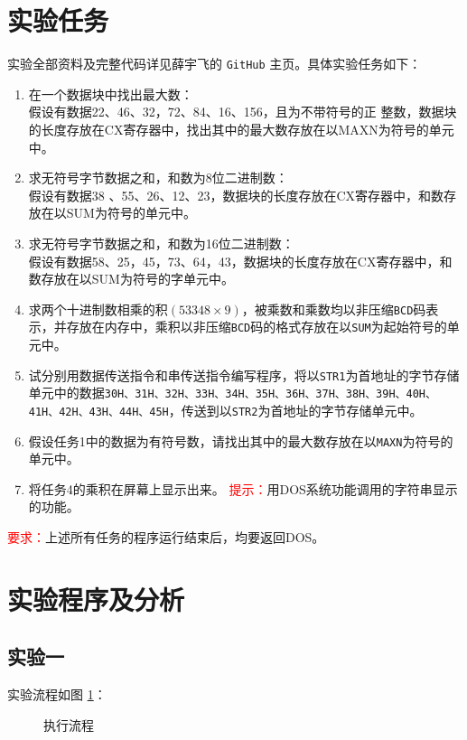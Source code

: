 \documentclass[11pt]{SEU-Digital-Report}
\begin{document}
\section{实验任务}
实验全部资料及完整代码详见薛宇飞的 \texttt{GitHub} 主页\cite{mygit}。具体实验任务如下：
\begin{enumerate}
    \item 在一个数据块中找出最大数：\\
    假设有数据22、46、32，72、84、16、156，且为不带符号的正 整数，数据块的长度存放在CX寄存器中，找出其中的最大数存放在以MAXN为符号的单元中。
    \item 求无符号字节数据之和，和数为8位二进制数：\\
    假设有数据38 、55、26、12、23，数据块的长度存放在CX寄存器中，和数存放在以SUM为符号的单元中。
    \item 求无符号字节数据之和，和数为16位二进制数：\\
    假设有数据58、25，45，73、64，43，数据块的长度存放在CX寄存器中，和数存放在以SUM为符号的字单元中。
    \item 求两个十进制数相乘的积$(53348\times 9)$，被乘数和乘数均以非压缩\texttt{BCD}码表示，并存放在内存中，乘积以非压缩\texttt{BCD}码的格式存放在以\texttt{SUM}为起始符号的单元中。
    \item 试分别用数据传送指令和串传送指令编写程序，将以\texttt{STR1}为首地址的字节存储单元中的数据\texttt{30H、31H、32H、33H、34H、35H、36H、37H、38H、39H、40H、41H、42H、43H、44H、45H}，传送到以\texttt{STR2}为首地址的字节存储单元中。
    \item 假设任务1中的数据为有符号数，请找出其中的最大数存放在以\texttt{MAXN}为符号的单元中。
    \item 将任务4的乘积在屏幕上显示出来。
    \textcolor{red}{提示：}用DOS系统功能调用的字符串显示的功能。
\end{enumerate}
\textcolor{red}{要求：}上述所有任务的程序运行结束后，均要返回DOS。

\section{实验程序及分析}
\subsection{实验一}
实验流程如图 \ref{fig:exp31}：
\begin{figure}[hbpt]
    \centering
    
    \caption{执行流程}
    \label{fig:exp31}
\end{figure}
\end{document}
